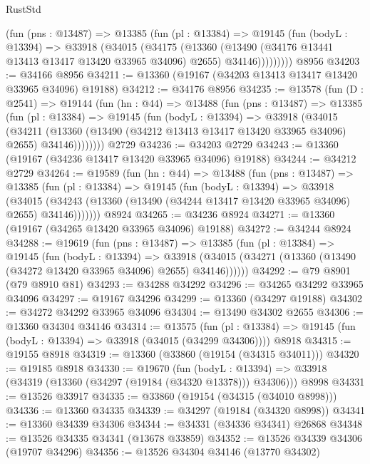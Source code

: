 \begin{lexlean}{RustStd}
\begin{coremodule}
          (fun (pns : @13487) =>
          @13385
            (fun (pl : @13384) =>
            @19145
              (fun (bodyL : @13394) =>
              @33918
                (@34015
                  (@34175
                    (@13360
                      (@13490 (@34176 @13441 @13413 @13417 @13420 @33965 @34096) @2655)
                      @34146)))))))))
    @8956
@34203 := @34166 @8956
@34211 := @13360 (@19167 (@34203 @13413 @13417 @13420 @33965 @34096) @19188)
@34212 := @34176 @8956
@34235 := @13578
    (fun (D : @2541) =>
    @19144
      (fun (hn : @44) =>
      @13488
        (fun (pns : @13487) =>
        @13385
          (fun (pl : @13384) =>
          @19145
            (fun (bodyL : @13394) =>
            @33918
              (@34015
                (@34211
                  (@13360 (@13490 (@34212 @13413 @13417 @13420 @33965 @34096) @2655) @34146))))))))
    @2729
@34236 := @34203 @2729
@34243 := @13360 (@19167 (@34236 @13417 @13420 @33965 @34096) @19188)
@34244 := @34212 @2729
@34264 := @19589
    (fun (hn : @44) =>
    @13488
      (fun (pns : @13487) =>
      @13385
        (fun (pl : @13384) =>
        @19145
          (fun (bodyL : @13394) =>
          @33918
            (@34015
              (@34243 (@13360 (@13490 (@34244 @13417 @13420 @33965 @34096) @2655) @34146)))))))
    @8924
@34265 := @34236 @8924
@34271 := @13360 (@19167 (@34265 @13420 @33965 @34096) @19188)
@34272 := @34244 @8924
@34288 := @19619
    (fun (pns : @13487) =>
    @13385
      (fun (pl : @13384) =>
      @19145
        (fun (bodyL : @13394) =>
        @33918 (@34015 (@34271 (@13360 (@13490 (@34272 @13420 @33965 @34096) @2655) @34146))))))
@34292 := @79 @8901 (@79 @8910 @81)
@34293 := @34288 @34292
@34296 := @34265 @34292 @33965 @34096
@34297 := @19167 @34296
@34299 := @13360 (@34297 @19188)
@34302 := @34272 @34292 @33965 @34096
@34304 := @13490 @34302 @2655
@34306 := @13360 @34304 @34146
@34314 := @13575
    (fun (pl : @13384) => @19145 (fun (bodyL : @13394) => @33918 (@34015 (@34299 @34306))))
    @8918
@34315 := @19155 @8918
@34319 := @13360 (@33860 (@19154 (@34315 @34011)))
@34320 := @19185 @8918
@34330 := @19670
    (fun (bodyL : @13394) => @33918 (@34319 (@13360 (@34297 (@19184 (@34320 @13378))) @34306)))
    @8998
@34331 := @13526 @33917
@34335 := @33860 (@19154 (@34315 (@34010 @8998)))
@34336 := @13360 @34335
@34339 := @34297 (@19184 (@34320 @8998))
@34341 := @13360 @34339 @34306
@34344 := @34331 (@34336 @34341) @26868
@34348 := @13526 @34335 @34341 (@13678 @33859)
@34352 := @13526 @34339 @34306 (@19707 @34296)
@34356 := @13526 @34304 @34146 (@13770 @34302)

\end{coremodule}
\end{lexlean}
